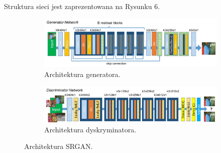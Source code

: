 \documentclass[a4paper,11pt, notitlepage ]{article}
\begin{document}
 Struktura sieci jest zaprezentowana na Rysunku 6.
\begin{figure}[h!]
	\centering
	\begin{subfigure}[b]{0.9\linewidth}
		\includegraphics[width=\linewidth]{SRGAN_Generator.png}
		\caption{Architektura generatora.}
	\end{subfigure}
	\begin{subfigure}[b]{0.9\linewidth}
		\includegraphics[width=\linewidth]{SRGAN_dyskryminator.png}
		\caption{Architektura dyskryminatora.}
	\end{subfigure}
	\caption{Architektura  SRGAN.}
	\label{fig:coffee3}
\end{figure}
\newpage
\end{document}
